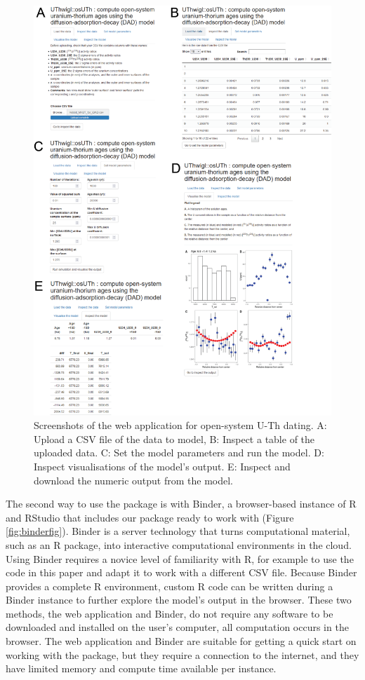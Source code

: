 \documentclass[]{elsarticle} %
\begin{document}
\begin{figure}
\includegraphics[width=0.95\linewidth]{figures/shiny-app-screenshots} \caption{Screenshots of the web application for open-system U-Th dating. A: Upload a CSV file of the data to model, B: Inspect a table of the uploaded data. C: Set the model parameters and run the model. D: Inspect visualisations of the model's output. E: Inspect and download the numeric output from the model.}\label{fig:shinyfig}
\end{figure}

The second way to use the package is with Binder, a browser-based instance of R and RStudio that includes our package ready to work with (Figure \ref{fig:binderfig}). Binder is a server technology that turns computational material, such as an R package, into interactive computational environments in the cloud. Using Binder requires a novice level of familiarity with R, for example to use the code in this paper and adapt it to work with a different CSV file. Because Binder provides a complete R environment, custom R code can be written during a Binder instance to further explore the model's output in the browser. These two methods, the web application and Binder, do not require any software to be downloaded and installed on the user's computer, all computation occurs in the browser. The web application and Binder are suitable for getting a quick start on working with the package, but they require a connection to the internet, and they have limited memory and compute time available per instance.
\end{document}
